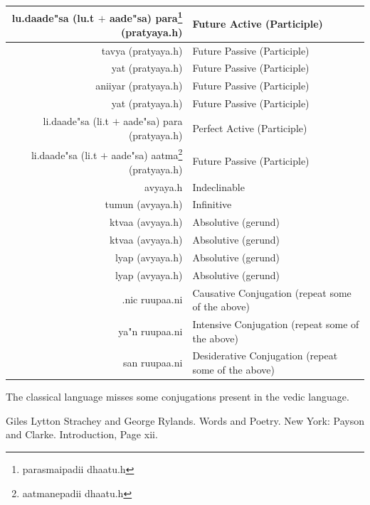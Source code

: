 \documentclass[a4paper, 12pt]{article}
\newcommand \sans[1]{
    \textsanskrit{#1}
}
\begin{document}
\begin{table}[h!]
\begin{center}
\begin{longtable}{|r|l|}
    \hline
    \sans{lu.daade"sa (lu.t $+$ aade"sa) para\footnote{\sans{parasmaipadii dhaatu.h}} (pratyaya.h)} &
    Future Active (Participle)\\
    \hline
    \sans{tavya (pratyaya.h)} &
    Future Passive (Participle)\\
    \hline
    \sans{yat (pratyaya.h)} &
    Future Passive (Participle)\\
    \hline
    \sans{aniiyar (pratyaya.h)} &
    Future Passive (Participle)\\
    \hline
    \sans{yat (pratyaya.h)} &
    Future Passive (Participle)\\
    \hline
    \sans{li.daade"sa (li.t $+$ aade"sa) para (pratyaya.h)} &
    Perfect Active (Participle)\\
    \hline
    \sans{li.daade"sa (li.t $+$ aade"sa) aatma\footnote{\sans{aatmanepadii dhaatu.h}} (pratyaya.h)} &
    Future Passive (Participle)\\
    \hline
    \sans{avyaya.h}&
    Indeclinable\\
    \hline
    \sans{tumun (avyaya.h)} &
    Infinitive\\
    \hline
    \sans{ktvaa (avyaya.h)} &
    Absolutive (gerund)\\
    \hline
    \sans{ktvaa (avyaya.h)} &
    Absolutive (gerund)\\
    \hline
    \sans{lyap (avyaya.h)} &
    Absolutive (gerund)\\
    \hline
    \sans{lyap (avyaya.h)} &
    Absolutive (gerund)\\
    \hline
    \sans{.nic ruupaa.ni} &
    Causative Conjugation (repeat some of the above)\\
    \hline
    \sans{ya"n ruupaa.ni} &
    Intensive Conjugation (repeat some of the above)\\
    \hline
    \sans{san ruupaa.ni} &
    Desiderative Conjugation (repeat some of the above)\\
    \hline
\end{longtable}
\end{center}
\end{table}

The classical language misses some conjugations present in the vedic language.


\begin{thebibliography}{00}
     Giles Lytton Strachey and George Rylands. Words and Poetry. New York: Payson and Clarke. Introduction, Page xii.
\end{thebibliography}
\end{document}
